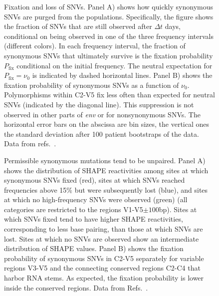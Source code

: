 \documentclass[11pt]{article}
\newcommand{\pfix}{P_{\mathrm{fix}}}
\newcommand{\env}{\textit{env}}
\newcommand{\shankaregion}{C2-V5}
\begin{document}
\begin{figure}
\begin{center}
\caption{Fixation and loss of SNVs.
Panel A) shows how quickly synonymous SNVs are purged from the populations. 
Specifically, the figure shows the fraction of SNVs that are still observed
after $\Delta t$ days, conditional on being observed in one of the three frequency 
intervals (different colors). 
In each frequency interval, the fraction of synonymous
SNVs that ultimately survive is the fixation probability $\pfix$ conditional on the
initial frequency. The neutral expectation for $\pfix=\nu_0$ is indicated by 
dashed horizontal lines.
Panel B) shows the fixation probability of synonymous SNVs as a function of $\nu_0$. Polymorphisms within \shankaregion{} fix less
often than expected for neutral SNVs (indicated by the diagonal line).
This suppression is not observed in other parts of \env{} or for nonsynonymous
SNVs.
The horizontal error bars on the abscissa are bin sizes, the vertical ones the
standard deviation after 100 patient bootstraps of the data. Data from
refs.~\cite{shankarappa_consistent_1999,liu_selection_2006, bunnik_autologous_2008}.}
\label{fig:fixp}
\end{center}
\end{figure}

\begin{figure}
\begin{center}
\caption{Permissible synonymous mutations tend to be unpaired.
Panel A) shows the distribution of SHAPE reactivities among sites at which synonymous 
SNVs fixed (red), sites at which SNVs reached frequencies above 15\% but
were subsequently lost (blue), and sites at which no high-frequency SNVs were observed (green) 
(all categories are restricted to the regions V1-V5$\pm 100$bp).
Sites at which SNVs fixed tend to have higher SHAPE reactivities, corresponding to
less base pairing, than those at which SNVs are lost.
Sites at which no SNVs are observed show an intermediate distribution of SHAPE values.
Panel B) shows the fixation probability of synonymous SNVs in
\shankaregion{} separately for variable regions V3-V5 and the connecting conserved 
regions C2-C4 that harbor RNA stems. As expected, the fixation probability is lower
inside the conserved regions. Data from Refs.~\cite{shankarappa_consistent_1999,
bunnik_autologous_2008, liu_selection_2006}.}
\label{fig:SHAPE}
\end{center}
\end{figure}
\end{document}
